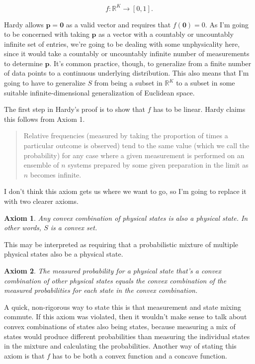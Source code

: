 \documentclass[12pt]{article}
\newtheorem{axiom}{Axiom}
\newcommand{\R}{{\mathbb R}} %
\newcommand{\maps}{\colon} %
\begin{document}
\begin{equation}
  \label{eq:measurement_defn}
  f \maps \R^K \to [0,1].
\end{equation}

Hardy allows $\mathbf{p} = \mathbf{0}$ as a valid vector and requires
that $f(\mathbf{0}) = 0$.  As I'm going to be concerned with taking
$\mathbf{p}$ as a vector with a countably or uncountably infinite set
of entries, we're going to be dealing with some unphysicality here,
since it would take a countably or uncountably infinite number of
measurements to determine $\mathbf{p}$.  It's common practice, though,
to generalize from a finite number of data points to a continuous
underlying distribution.  This also means that I'm going to have to
generalize $S$ from being a subset in $\R^K$ to a subset in some
suitable infinite-dimensional generalization of Euclidean space.

The first step in Hardy's proof is to show that $f$ has to be linear.
Hardy claims this follows from Axiom 1.

\begin{quote}
  Relative frequencies (measured by taking the proportion of times a
  particular outcome is observed) tend to the same value (which we
  call the probability) for any case where a given measurement is
  performed on an ensemble of $n$ systems prepared by some given
  preparation in the limit as $n$ becomes infinite.
\end{quote}

I don't think this axiom gets us where we want to go, so I'm going to
replace it with two clearer axioms.

\begin{axiom}
  Any convex combination of physical states is also a physical state.
  In other words, $S$ is a convex set.
\end{axiom}

This may be interpreted as requiring that a probabilistic mixture of
multiple physical states also be a physical state.

\begin{axiom}
  The measured probability for a physical state that's a convex
  combination of other physical states equals the convex combination
  of the measured probabilities for each state in the convex
  combination.
\end{axiom}

A quick, non-rigorous way to state this is that measurement and state
mixing commute.  If this axiom was violated, then it wouldn't make
sense to talk about convex combinations of states also being states,
because measuring a mix of states would produce different
probabilities than measuring the individual states in the mixture and
calculating the probabilities.  Another way of stating this axiom is
that $f$ has to be both a convex function and a concave function.
\end{document}
